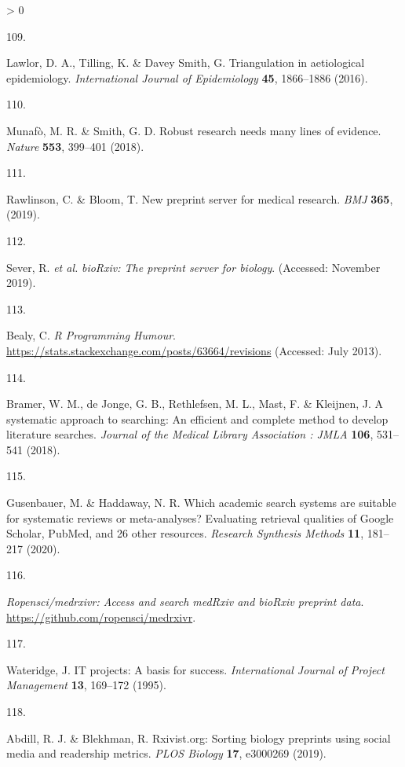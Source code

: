 \documentclass[a4paper, twoside]{templates/ociamthesis}
\newlength{\cslhangindent}
\newlength{\csllabelwidth}
\newenvironment{CSLReferences}[3] %
 {%
  \setlength{\parindent}{0pt}
  \ifodd #1 \everypar{\setlength{\hangindent}{\cslhangindent}}\ignorespaces\fi
  \ifnum #2 > 0
  \setlength{\parskip}{#2\baselineskip}
  \fi
 }%
 {}
\newcommand{\CSLLeftMargin}[1]{\parbox[t]{\maxof{\widthof{#1}}{\csllabelwidth}}{#1}}
\newcommand{\CSLRightInline}[1]{\parbox[t]{\linewidth - \csllabelwidth}{#1}}
\begin{document}
\begin{CSLReferences}{0}{0}
\leavevmode\hypertarget{ref-lawlor2016}{}%
\CSLLeftMargin{109. }
\CSLRightInline{Lawlor, D. A., Tilling, K. \& Davey Smith, G. Triangulation in aetiological epidemiology. \emph{International Journal of Epidemiology} \textbf{45}, 1866--1886 (2016).}

\leavevmode\hypertarget{ref-munafo2018}{}%
\CSLLeftMargin{110. }
\CSLRightInline{Munafò, M. R. \& Smith, G. D. Robust research needs many lines of evidence. \emph{Nature} \textbf{553}, 399--401 (2018).}

\leavevmode\hypertarget{ref-rawlinson2019}{}%
\CSLLeftMargin{111. }
\CSLRightInline{Rawlinson, C. \& Bloom, T. New preprint server for medical research. \emph{BMJ} \textbf{365}, (2019).}

\leavevmode\hypertarget{ref-sever2019}{}%
\CSLLeftMargin{112. }
\CSLRightInline{Sever, R. \emph{et al.} \emph{{bioRxiv}: The preprint server for biology}. (Accessed: November 2019).}

\leavevmode\hypertarget{ref-beely2013}{}%
\CSLLeftMargin{113. }
\CSLRightInline{Bealy, C. \emph{R {Programming Humour}}. \url{https://stats.stackexchange.com/posts/63664/revisions} (Accessed: July 2013).}

\leavevmode\hypertarget{ref-bramer2018}{}%
\CSLLeftMargin{114. }
\CSLRightInline{Bramer, W. M., de Jonge, G. B., Rethlefsen, M. L., Mast, F. \& Kleijnen, J. A systematic approach to searching: An efficient and complete method to develop literature searches. \emph{Journal of the Medical Library Association : JMLA} \textbf{106}, 531--541 (2018).}

\leavevmode\hypertarget{ref-gusenbauer2020}{}%
\CSLLeftMargin{115. }
\CSLRightInline{Gusenbauer, M. \& Haddaway, N. R. Which academic search systems are suitable for systematic reviews or meta-analyses? Evaluating retrieval qualities of {Google Scholar}, {PubMed}, and 26 other resources. \emph{Research Synthesis Methods} \textbf{11}, 181--217 (2020).}

\leavevmode\hypertarget{ref-zotero-15029}{}%
\CSLLeftMargin{116. }
\CSLRightInline{\emph{Ropensci/medrxivr: Access and search {medRxiv} and {bioRxiv} preprint data}. \url{https://github.com/ropensci/medrxivr}.}

\leavevmode\hypertarget{ref-wateridge1995}{}%
\CSLLeftMargin{117. }
\CSLRightInline{Wateridge, J. {IT} projects: A basis for success. \emph{International Journal of Project Management} \textbf{13}, 169--172 (1995).}

\leavevmode\hypertarget{ref-abdill2019}{}%
\CSLLeftMargin{118. }
\CSLRightInline{Abdill, R. J. \& Blekhman, R. Rxivist.org: Sorting biology preprints using social media and readership metrics. \emph{PLOS Biology} \textbf{17}, e3000269 (2019).}


\end{CSLReferences}
\end{document}
